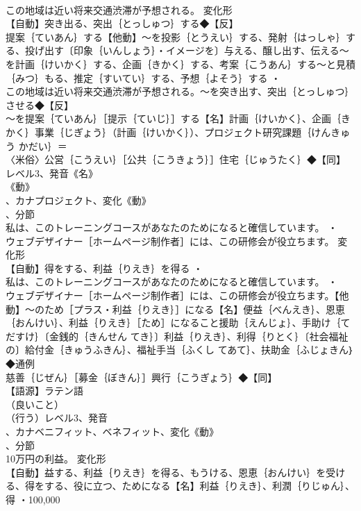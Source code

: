 \documentclass[8pt]{extreport}
\begin{document}
\begin{CJK}{UTF8}{min}
\\	この地域は近い将来交通渋滞が予想される。	変化形 
\\	【自動】突き出る、突出｛とっしゅつ｝する◆【反】
\\	提案｛ていあん｝する【他動】～を投影｛とうえい｝する、発射｛はっしゃ｝する、投げ出す〔印象｛いんしょう｝・イメージを〕与える、醸し出す、伝える～を計画｛けいかく｝する、企画｛きかく｝する、考案｛こうあん｝する～と見積｛みつ｝もる、推定｛すいてい｝する、予想｛よそう｝する ・
\\	この地域は近い将来交通渋滞が予想される。～を突き出す、突出｛とっしゅつ｝させる◆【反】
\\	～を提案｛ていあん｝［提示｛ていじ｝］する【名】計画｛けいかく｝、企画｛きかく｝事業｛じぎょう｝（計画｛けいかく｝）、プロジェクト研究課題｛けんきゅう かだい｝＝ 
\\	〈米俗〉公営｛こうえい｝［公共｛こうきょう｝］住宅｛じゅうたく｝◆【同】
\\	レベル3、発音《名》
\\	《動》
\\	、カナプロジェクト、変化《動》
\\	、分節
\\	私は、このトレーニングコースがあなたのためになると確信しています。 ・
\\	ウェブデザイナー［ホームページ制作者］には、この研修会が役立ちます。	変化形 
\\	【自動】得をする、利益｛りえき｝を得る ・
\\	私は、このトレーニングコースがあなたのためになると確信しています。 ・
\\	ウェブデザイナー［ホームページ制作者］には、この研修会が役立ちます。【他動】～のため［プラス・利益｛りえき｝］になる【名】便益｛べんえき｝、恩恵｛おんけい｝、利益｛りえき｝［ため］になること援助｛えんじょ｝、手助け｛てだすけ｝〔金銭的｛きんせん てき｝〕利益｛りえき｝、利得｛りとく｝〔社会福祉の〕給付金｛きゅうふきん｝、福祉手当｛ふくし てあて｝、扶助金｛ふじょきん｝◆通例
\\	慈善｛じぜん｝［募金｛ぼきん｝］興行｛こうぎょう｝◆【同】
\\	【語源】ラテン語
\\	（良いこと）
\\	（行う）レベル3、発音
\\	、カナベニフィット、ベネフィット、変化《動》
\\	、分節
\\	10万円の利益。	変化形 
\\	【自動】益する、利益｛りえき｝を得る、もうける、恩恵｛おんけい｝を受ける、得をする、役に立つ、ためになる【名】利益｛りえき｝、利潤｛りじゅん｝、得 ・100,000 

\end{CJK}
\end{document}
